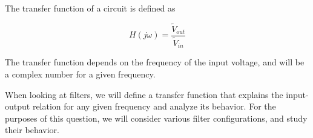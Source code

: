 


The transfer function of a circuit is defined as

\begin{equation}
H(j \omega) = \frac{\widetilde{V}_{out}}{\widetilde{V}_{in}}
\end{equation}

The transfer function depends on the frequency of the input voltage, and will be a complex number for a given frequency. 

When looking at filters, we will define a transfer function that explains the input-output relation for any given frequency and analyze its behavior. 
For the purposes of this question, we will consider various filter configurations, and study their behavior.

